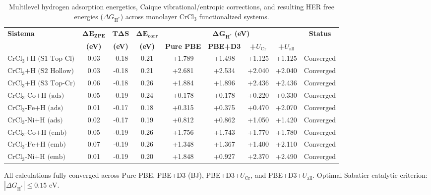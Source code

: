 \begin{table}[htbp]
  \centering
  \caption{Multilevel hydrogen adsorption energetics, Caique vibrational/entropic corrections, and resulting HER free energies ($\Delta G_{\text{H}^*}$) across monolayer $\text{CrCl}_3$ functionalized systems.}
  \label{tab:sistemas_termo_all_functionals}
  \vspace{0.3cm}
  \small
  \begin{tabular}{l c c c c c c c c}
    \toprule
    \textbf{Sistema} & $\boldsymbol{\Delta E_{\text{ZPE}}}$ & $\boldsymbol{T \Delta S}$ & $\boldsymbol{\Delta E_{\text{corr}}}$ & \multicolumn{4}{c}{$\boldsymbol{\Delta G_{\text{H}^*}}$ \textbf{(eV)}} & \textbf{Status} \\
    \cmidrule(lr){5-8}
    & \textbf{(eV)} & \textbf{(eV)} & \textbf{(eV)} & \textbf{Pure PBE} & \textbf{PBE+D3} & \textbf{+$U_{\text{Cr}}$} & \textbf{+$U_{\text{all}}$} & \\
    \midrule
    $\text{CrCl}_3\text{+H (S1 Top-Cl)}$ & 0.03 & -0.18 & 0.21 & +1.789 & +1.498 & +1.125 & +1.125 & Converged \\
    $\text{CrCl}_3\text{+H (S2 Hollow)}$ & 0.03 & -0.18 & 0.21 & +2.681 & +2.534 & +2.040 & +2.040 & Converged \\
    $\text{CrCl}_3\text{+H (S3 Top-Cr)}$ & 0.06 & -0.18 & 0.26 & +1.884 & +1.896 & +2.436 & +2.436 & Converged \\
    $\text{CrCl}_3\text{-Co+H (ads)}$ & 0.05 & -0.19 & 0.24 & +0.178 & +0.178 & +0.220 & +0.330 & Converged \\
    $\text{CrCl}_3\text{-Fe+H (ads)}$ & 0.01 & -0.17 & 0.18 & +0.315 & +0.375 & +0.470 & +2.070 & Converged \\
    $\text{CrCl}_3\text{-Ni+H (ads)}$ & 0.02 & -0.17 & 0.19 & +0.812 & +0.862 & +1.050 & +1.420 & Converged \\
    $\text{CrCl}_3\text{-Co+H (emb)}$ & 0.05 & -0.19 & 0.26 & +1.756 & +1.743 & +1.770 & +1.780 & Converged \\
    $\text{CrCl}_3\text{-Fe+H (emb)}$ & 0.07 & -0.19 & 0.26 & +1.348 & +1.367 & +1.400 & +2.110 & Converged \\
    $\text{CrCl}_3\text{-Ni+H (emb)}$ & 0.01 & -0.19 & 0.20 & +1.848 & +0.927 & +2.370 & +2.490 & Converged \\
    \bottomrule
  \end{tabular}
  \vspace{0.15cm}
    \begin{minipage}{0.95\textwidth}
      \footnotesize
      All calculations fully converged across Pure PBE, PBE+D3 (BJ), PBE+D3+$U_{\text{Cr}}$, and PBE+D3+$U_{\text{all}}$. Optimal Sabatier catalytic criterion: $|\Delta G_{\text{H}^*}| \le 0.15\text{ eV}$.
    \end{minipage}
\end{table}
